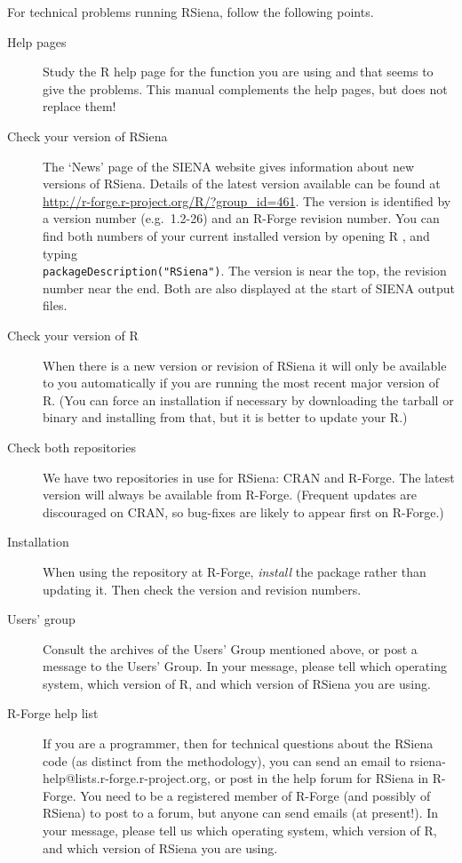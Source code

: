 \documentclass[a4paper,fleqn,11pt]{article}
\newcommand{\+}{\, + \,}
\newcommand{\R}{{\sf R }}
\newcommand{\Rn}{{\sf R}}
\newcommand{\rs}{{\sf RSiena}}
\newcommand{\RS}{{\sf RSiena }}
\newcommand{\SI}{{\sf SIENA }}
\begin{document}
For technical problems running \rs, follow the following points.
\begin{description}
\item[Help pages] Study the \R help page for the function you are using and that seems to give
      the problems. This manual complements the help pages,
      but does not replace them!
\item[Check your version of \RS]
  The `News' page of the \SI website gives information about new versions
  of \rs. Details of the latest version available can
  be found at {\small{\url{http://r-forge.r-project.org/R/?group_id=461}}}.
  The version is
  identified by a version number (e.g.\ 1.2-26) and an R-Forge revision
  number. You can find both numbers of your current installed version by
  opening \R, and typing \\
  \verb|packageDescription("RSiena")|. The version is
  near the top, the revision number near the end. Both are also displayed at the
  start of \SI output files.
\item[Check your version of \Rn] When there is a new version or revision of \RS
  it will only be available to you automatically if you are running the most
  recent major version of \Rn. (You can force an installation if
  necessary by downloading the tarball or binary and installing from that, but
  it is better to update your \Rn.)
\item [Check both repositories] We have two repositories in use for \rs: CRAN
  and R-Forge. The latest version will always be available from
  R-Forge. (Frequent updates are discouraged on CRAN, so bug-fixes are likely to
  appear first on R-Forge.)
\item[Installation] When using the repository at R-Forge, \emph{install} the
  package rather than updating it. Then check the version and revision numbers.
\item[Users' group] Consult the archives of the Users' Group mentioned above, or post
     a message to the Users' Group. In your message,
     please tell which operating system, which version of \Rn, and which version
     of \RS you are using.
\item[R-Forge help list]
     If you are a programmer, then
     for technical questions about the \RS code (as distinct from the
     methodology), you can send an email to
     rsiena-help@lists.r-forge.r-project.org, or post in the help forum for \RS in
     R-Forge. You need to be a registered member of R-Forge (and possibly of \rs)
     to post to a forum, but anyone can send emails (at present!). In your message,
     please tell us which operating system, which version of \Rn, and which version
     of \RS you are using.
\end{description}
\end{document}
